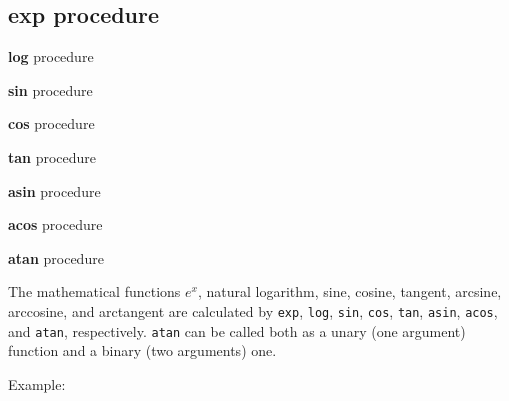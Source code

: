 \documentclass[twoside,9pt]{report}
\begin{document}
\subsection{exp procedure}
\label{exp-procedure}

\noindent \textbf{log} procedure


\noindent \textbf{sin} procedure


\noindent \textbf{cos} procedure


\noindent \textbf{tan} procedure


\noindent \textbf{asin} procedure


\noindent \textbf{acos} procedure


\noindent \textbf{atan} procedure



The mathematical functions ${e}^{x}$, natural logarithm, sine, cosine, tangent, arcsine, arccosine, and arctangent are calculated by \texttt{exp}, \texttt{log}, \texttt{sin}, \texttt{cos}, \texttt{tan}, \texttt{asin}, \texttt{acos}, and \texttt{atan}, respectively. \texttt{atan} can be called both as a unary (one argument) function and a binary (two arguments) one.



Example:
\end{document}
